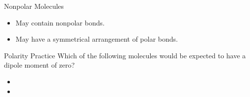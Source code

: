 \documentclass[notes=hide]{beamer}
\begin{document}
\begin{frame}{Nonpolar Molecules}
	\begin{itemize}
		\item \alert{May} contain \alert{nonpolar} bonds.

			\begin{center}
				\hspace{5em}
			\end{center}

		\item \alert{May} have a symmetrical arrangement of polar bonds.

			\bigskip

			\begin{center}
				\hspace{5em}
			\end{center}
	\end{itemize}
\end{frame}

\begin{frame}[t]{Polarity Practice}
	Which of the following molecules would be expected to have a dipole
	moment of zero?

	\begin{itemize}
		\item {}
		\item {}
	\end{itemize}
	
	\vspace{8em}
\end{frame}

%
\end{document}
